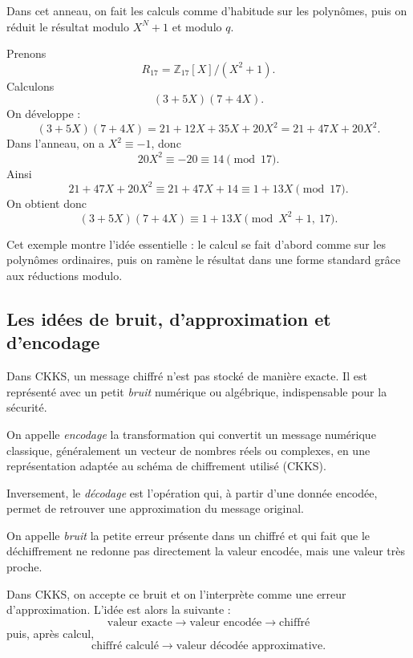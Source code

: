 Dans cet anneau, on fait les calculs comme d'habitude sur les polynômes, puis on réduit le résultat modulo $X^N+1$ et modulo $q$.

\begin{example}
Prenons
\[
R_{17}=\mathbb{Z}_{17}[X]/(X^2+1).
\]
Calculons
\[
(3+5X)(7+4X).
\]
On développe :
\[
(3+5X)(7+4X)=21+12X+35X+20X^2=21+47X+20X^2.
\]
Dans l'anneau, on a $X^2\equiv -1$, donc
\[
20X^2\equiv -20 \equiv 14 \pmod{17}.
\]
Ainsi
\[
21+47X+20X^2 \equiv 21+47X+14 \equiv 1+13X \pmod{17}.
\]
On obtient donc
\[
(3+5X)(7+4X)\equiv 1+13X \pmod{X^2+1,\ 17}.
\]
\end{example}

Cet exemple montre l'idée essentielle : le calcul se fait d'abord comme sur les polynômes ordinaires, puis on ramène le résultat dans une forme standard grâce aux réductions modulo.

\subsection{Les idées de bruit, d'approximation et d'encodage}

Dans CKKS, un message chiffré n'est pas stocké de manière exacte. Il est représenté avec un petit \emph{bruit} numérique ou algébrique, indispensable pour la sécurité.

\begin{definition}
On appelle \emph{encodage} la transformation qui convertit un message numérique classique, généralement un vecteur de nombres réels ou complexes, en une représentation adaptée au schéma de chiffrement utilisé (CKKS). 

Inversement, le \emph{décodage} est l'opération qui, à partir d'une donnée encodée, permet de retrouver une approximation du message original.
\end{definition}

\begin{definition}[Bruit]
On appelle \emph{bruit} la petite erreur présente dans un chiffré et qui fait que le déchiffrement ne redonne pas directement la valeur encodée, mais une valeur très proche.
\end{definition}

Dans CKKS, on accepte ce bruit et on l'interprète comme une erreur d'approximation. L'idée est alors la suivante :
\[
\text{valeur exacte} \longrightarrow \text{valeur encodée} \longrightarrow \text{chiffré}
\]
puis, après calcul,
\[
\text{chiffré calculé} \longrightarrow \text{valeur décodée approximative}.
\]

